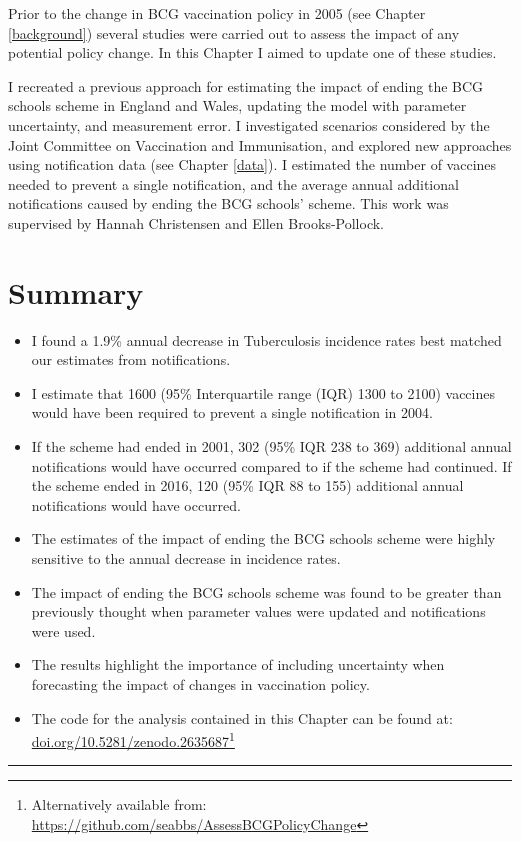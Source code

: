 \documentclass[11pt,twoside]{bristolthesis}
\begin{document}
  Prior to the change in BCG vaccination policy in 2005 (see Chapter \ref{background}) several studies were carried out to assess the impact of any potential policy change. In this Chapter I aimed to update one of these studies.
  
  I recreated a previous approach for estimating the impact of ending the BCG schools scheme in England and Wales, updating the model with parameter uncertainty, and measurement error. I investigated scenarios considered by the Joint Committee on Vaccination and Immunisation, and explored new approaches using notification data (see Chapter \ref{data}). I estimated the number of vaccines needed to prevent a single notification, and the average annual additional notifications caused by ending the BCG schools' scheme. This work was supervised by Hannah Christensen and Ellen Brooks-Pollock.
  
  \hypertarget{summary-4}{%
  \section{Summary}\label{summary-4}}
  \begin{itemize}
  \item
    I found a 1.9\% annual decrease in Tuberculosis incidence rates best matched our estimates from notifications.
  \item
    I estimate that 1600 (95\% Interquartile range (IQR) 1300 to 2100) vaccines would have been required to prevent a single notification in 2004.
  \item
    If the scheme had ended in 2001, 302 (95\% IQR 238 to 369) additional annual notifications would have occurred compared to if the scheme had continued. If the scheme ended in 2016, 120 (95\% IQR 88 to 155) additional annual notifications would have occurred.
  \item
    The estimates of the impact of ending the BCG schools scheme were highly sensitive to the annual decrease in incidence rates.
  \item
    The impact of ending the BCG schools scheme was found to be greater than previously thought when parameter values were updated and notifications were used.
  \item
    The results highlight the importance of including uncertainty when forecasting the impact of changes in vaccination policy.
  \item
    The code for the analysis contained in this Chapter can be found at: \href{https://doi.org/10.5281/zenodo.2635687}{doi.org/10.5281/zenodo.2635687}\footnote{Alternatively available from: \url{https://github.com/seabbs/AssessBCGPolicyChange}}
  \end{itemize}
  \begin{center}\rule{0.5\linewidth}{\linethickness}\end{center}
  
\end{document}
